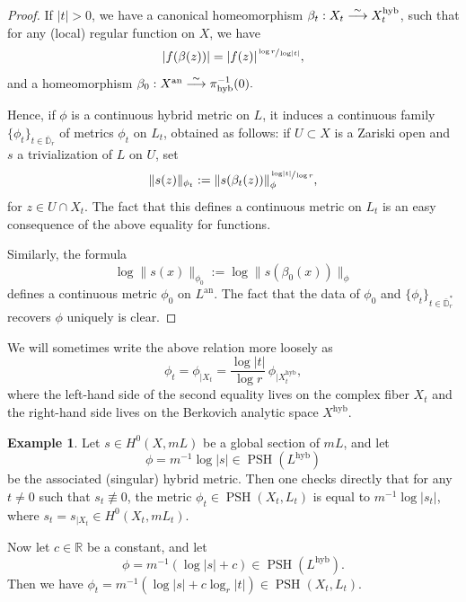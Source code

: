 \documentclass[JEP,XML,SOM,Unicode,published]{cedram}
\newcommand{\To}[1]{\mathchoice{\xrightarrow{\textstyle\kern4pt#1\kern3pt}}{\stackrel{#1}{\longrightarrow}}{}{}}
\theoremstyle{definition}
\newtheorem{ex}[equation]{Example}
\newcommand \D {\mathbb{D}}
\newcommand \R{\mathbb R}
\newcommand{\an}{\mathrm{an}}
\newcommand{\hyb}{\mathrm{hyb}}
\DeclareMathOperator{\PSH}{PSH}
\begin{document}
\begin{proof}
If $\lvert t \rvert >0$, we have a canonical homeomorphism $\beta_t: X_t \To{\sim} X^{\hyb}_t$, such that for any (local) regular function on $X$, we have
\[
\lvert f(\beta(z)) \rvert = \lvert f(z) \rvert^{\sfrac{\log r}{\log \lvert t \rvert}},
\]
and a homeomorphism $\beta_0: X^{\an} \To{\sim} \pi_{\hyb}^{-1}(0).$

Hence, if $\phi$ is a continuous hybrid metric on $L$, it induces a continuous family $\{\phi_{t}\}_{t\in \bar{\D}_r}$ of metrics $\phi_t$ on $L_t$, obtained as follows: if $U \subset X$ is a Zariski open and $s$ a trivialization of $L$ on $U$, set
\[
\lVert s(z) \rVert_{\phi_{t}}:= \lVert s(\beta_t(z)) \rVert_{\phi}^{\sfrac{\log \lvert t \rvert}{\log r}},
\]
for $z \in U \cap X_t$. The fact that this defines a continuous metric on $L_t$ is an easy consequence of the above equality for functions.

Similarly, the formula
\[
\log \lVert s(x) \rVert_{\phi_0}:= \log \lVert s(\beta_0(x)) \rVert_{\phi}
\]
defines a continuous metric $\phi_0$ on $L^{\an}$.
The fact that the data of $\phi_0$ and $\{ \phi_{t} \}_{t \in \bar{\D}^*_r}$ recovers $\phi$ uniquely is clear.
\end{proof}
We will sometimes write the above relation more loosely as
\[
\phi_{t} = \phi_{| X_t} = \frac{\log \lvert t \rvert}{\log r}\, \phi_{|X^{\hyb}_{t}},
\]
where the left-hand side of the second equality lives on the complex fiber $X_t$ and the right-hand side lives on the Berkovich analytic space $X^{\hyb}$.
\begin{ex}
Let $s \in H^0(X,mL)$ be a global section of $mL$, and let
\[
\phi = m^{-1} \log \lvert s \rvert \in \PSH(L^{\hyb})
\]
be the associated (singular) hybrid metric. Then one checks directly that for any $t \neq 0$ such that $s_t \not \equiv 0$, the metric $\phi_{t} \in \PSH(X_t, L_t)$ is equal to $m^{-1} \log \lvert s_t \rvert$, where $s_t = s_{| X_t} \in H^0(X_t, mL_t)$.

Now let $c \in \R$ be a constant, and let
\[
\phi = m^{-1} (\log \lvert s \rvert +c) \in \PSH(L^{\hyb}).
\]
Then we have $\phi_{t} = m^{-1} (\log \lvert s \rvert +c \log_r \lvert t \rvert) \in \PSH(X_t, L_t).$
\end{ex}
\end{document}
